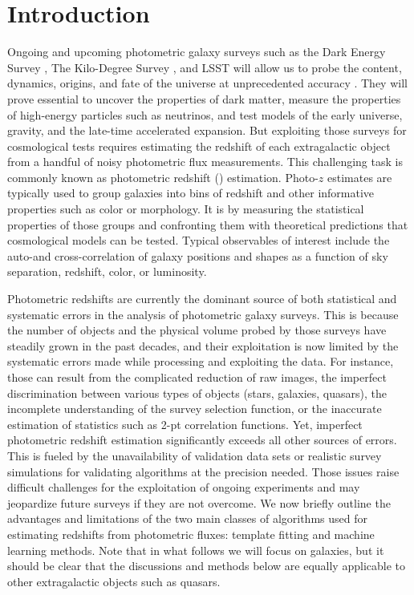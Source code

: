 \documentclass[aps,prd,showpacs,superscriptaddress,groupedaddress]{revtex4}  %
\begin{document}

\maketitle

  
\section{Introduction}

Ongoing and upcoming photometric galaxy surveys such as the Dark Energy Survey \citep[DES,][]{Abbott:2005bi}, The Kilo-Degree Survey \citep[KIDS,][]{deJong:2013}, and LSST \citep{Abell:2009aa} will allow us to probe the content, dynamics, origins, and fate of the universe at unprecedented accuracy \citep[see \eg][]{Peacock:2006kj, Weinberg:2012es}. They will prove essential to uncover the properties of dark matter, measure the properties of high-energy particles such as neutrinos, and test models of the early universe, gravity, and the late-time accelerated expansion.
But exploiting those surveys for cosmological tests requires estimating the redshift of each extragalactic object from a handful of noisy photometric flux measurements.
This challenging task is commonly known as photometric redshift (\photoz) estimation.
Photo-$z$ estimates are typically used to group galaxies into bins of redshift and other informative properties such as color or morphology.
It is by measuring the statistical properties of those groups and confronting them with theoretical predictions that cosmological models can be tested.
Typical observables of interest include the auto-and cross-correlation of galaxy positions and shapes as a function of sky separation, redshift, color, or luminosity.

Photometric redshifts are currently the dominant source of both statistical and systematic errors in the analysis of photometric galaxy surveys.
This is because the number of objects and the physical volume probed by those surveys have steadily grown in the past decades, and their exploitation is now limited by the systematic errors made while processing and exploiting the data.
For instance, those can result from the complicated reduction of raw images, the imperfect discrimination between various types of objects (\eg stars, galaxies, quasars), the incomplete understanding of the survey selection function, or the inaccurate estimation of statistics such as 2-pt correlation functions.
Yet, imperfect photometric redshift estimation significantly exceeds all other sources of errors.
This is fueled by the unavailability of validation data sets or realistic survey simulations for validating \photoz algorithms at the precision needed.
Those issues raise difficult challenges for the exploitation of ongoing experiments and may jeopardize future surveys if they are not overcome.
We now briefly outline the advantages and limitations of the two main classes of algorithms used for estimating redshifts from photometric fluxes: template fitting and machine learning methods.
Note that in what follows we will focus on galaxies, but it should be clear that the discussions and methods below are equally applicable to other extragalactic objects such as quasars.
\end{document}
